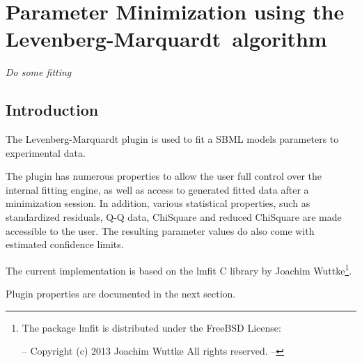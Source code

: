 \newcommand{\pname}{Levenberg-Marquardt}

\chapter*{Parameter Minimization using the \pname\ algorithm}
\setcounter{chapter}{1}
\emph{Do some fitting}
\section{Introduction}
The Levenberg-Marquardt plugin is used to fit a SBML models parameters to experimental data. 

The plugin has numerous properties to allow the user full control over the internal fitting engine, as well as 
access to generated fitted data after a minimization session. In addition, various statistical properties, such as standardized residuals, Q-Q data, ChiSquare and reduced ChiSquare are made accessible to the user. The resulting parameter values do also come with estimated confidence limits.

The current implementation is based on the lmfit C library by Joachim Wuttke\footnote{The package lmfit is distributed under the FreeBSD License:

--
  Copyright (c) 2013 Joachim Wuttke All rights reserved.
--}.


Plugin properties are documented in the next section.

